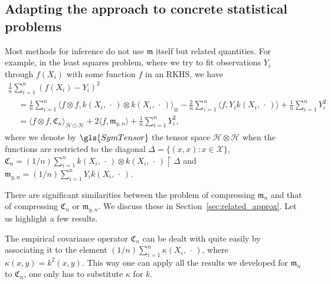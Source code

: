 \documentclass[AHL,Unicode,longabstracts,published]{cedram}
\theoremstyle{remark}
\newcommand{\restrr}
{\!\!\upharpoonright\!\!}
\newcommand{\X}{\mathcal{X}}
\newcommand{\cH}{\mathcal{H}}
\newcommand{\fkC}{\mathfrak{C}}
\newcommand{\mean}{\mathfrak{m}}
\begin{document}
\subsection{Adapting the approach to concrete statistical problems} \label{sec:intro_application}
Most methods for inference do not use $\mean$ itself but related quantities. For example, in the least squares problem, where we try to fit observations $Y_i$ through $f(X_i)$ with some function $f$ in an RKHS, we have
\begin{multline*}
\frac{1}{n} \sum_{i=1}^n (f(X_i) - Y_i)^2
\\
\begin{aligned}
&= \frac{1}{n} \sum_{i=1}^n \bigl\langle f \otimes f, k(X_i,\,\cdot\,) \otimes k(X_i,\,\cdot\,) \bigr\rangle_{\otimes} - \frac{2}{n} \sum_{i=1}^n \langle f, Y_i k(X_i,\,\cdot\,) \rangle + \frac{1}{n} \sum_{i=1}^n Y_i^2 \\
&= \langle f \otimes f, \fkC_n \rangle_{\cH \odot \cH} + 2 \langle f, \mean_{y,n} \rangle + \frac{1}{n} \sum_{i=1}^n Y_i^2,
\end{aligned}
\end{multline*}
where we denote by $\gls{SymTensor}$ the tensor space $\cH \otimes \cH$ when the functions are restricted to the diagonal $\Delta = \{(x,x) : x \in \X\}$, $\fkC_n = (1/n) \sum_{i=1}^n k(X_i,\,\cdot\,) \otimes k(X_i,\,\cdot\,)\restrr \Delta$ and $\mean_{y,n} = (1/n) \sum_{i=1}^n Y_i k(X_i,\,\cdot\,)$.

There are significant similarities between the problem of compressing $\mean_n$ and that of compressing $\fkC_n$ or $\mean_{y,n}$. We discuss these in Section~\ref{sec:related_approx}. Let us highlight a few results.

The empirical covariance operator $\fkC_n$ can be dealt with quite easily by associating it to the element $(1/n) \sum_{i=1}^n \kappa(X_i,\,\cdot\,)$, where $\kappa(x,y) = k^2(x,y)$. This way one can apply all the results we developed for $\mean_n$ to $\fkC_n$, one only has to substitute $\kappa$ for $k$.
\end{document}
